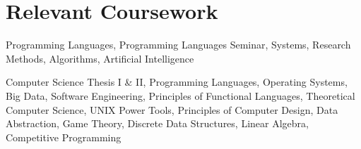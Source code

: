 \section{Relevant Coursework}

%
{}%
{}%
{}%
{Programming Languages, Programming Languages Seminar, Systems, Research
Methods, Algorithms, Artificial Intelligence%
\newline{}
}

%
{}%
{}%
{}%
{Computer Science Thesis I \& II, Programming Languages, Operating Systems, Big
Data, Software Engineering, Principles of Functional Languages, Theoretical
Computer Science, UNIX Power Tools, Principles of Computer Design, Data
Abstraction, Game Theory, Discrete Data Structures, Linear Algebra, Competitive
Programming
\newline{}
}